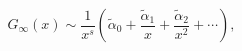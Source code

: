 \begin{equation}
G_{\infty}(x)\sim \frac{1}{x^s}\left(\tilde\alpha_0 +\frac{
\tilde\alpha_1}{x}+\frac{\tilde\alpha_2}{x ^2}+\cdots\right),
\label{general}
\end{equation}

